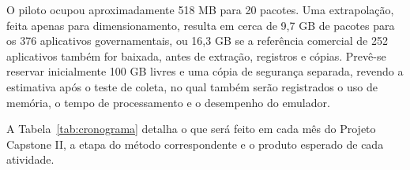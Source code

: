 O piloto ocupou aproximadamente 518 MB para 20 pacotes. Uma extrapolação, feita apenas para dimensionamento, resulta em cerca de 9,7 GB de pacotes para os 376 aplicativos governamentais, ou 16,3 GB se a referência comercial de 252 aplicativos também for baixada, antes de extração, registros e cópias. Prevê-se reservar inicialmente 100 GB livres e uma cópia de segurança separada, revendo a estimativa após o teste de coleta, no qual também serão registrados o uso de memória, o tempo de processamento e o desempenho do emulador.

\label{sec:cronograma}

A Tabela~\ref{tab:cronograma} detalha o que será feito em cada mês do Projeto Capstone II, a etapa do método correspondente e o produto esperado de cada atividade.

